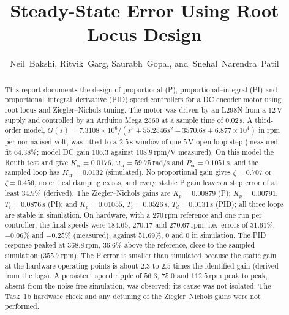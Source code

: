 \documentclass[lettersize,journal]{IEEEtran}
\newcommand{\code}[1]{\texttt{\detokenize{#1}}}
\newcommand{\Kcr}{K_{\mathrm{cr}}}
\newcommand{\wcr}{\omega_{\mathrm{cr}}}
\newcommand{\Pcr}{P_{\mathrm{cr}}}
\newcommand{\rpm}{\,\text{rpm}}
\begin{document}
\title{Steady-State Error Using Root Locus Design}

\author{Neil~Bakshi,
        Ritvik~Garg,
        Saurabh~Gopal,
        and~Snehal~Narendra~Patil
        }


\maketitle

\begin{abstract}
This report documents the design of proportional (P), proportional--integral (PI) and proportional--integral--derivative (PID) speed controllers for a DC encoder motor using root locus and Ziegler--Nichols tuning. The motor was driven by an L298N from a $12\,\text{V}$ supply and controlled by an Arduino Mega 2560 at a sample time of $0.02\,\text{s}$. A third-order model, $G(s)=7.3108\times10^{6}/(s^3+55.2546s^2+3570.6s+6.877\times10^{4})$ in rpm per normalised volt, was fitted to a $2.5\,\text{s}$ window of one $5\,\text{V}$ open-loop step (measured; fit $64.38\%$; model DC gain $106.3$ against $108.9\rpm/\text{V}$ measured). On this model the Routh test and \code{allmargin} give $\Kcr=0.0176$, $\wcr=59.75\,\text{rad/s}$ and $\Pcr=0.1051\,\text{s}$, and the sampled loop has $\Kcr=0.0132$ (simulated). No proportional gain gives $\zeta=0.707$ or $\zeta=0.456$, no critical damping exists, and every stable P gain leaves a step error of at least $34.9\%$ (derived). The Ziegler--Nichols gains are $K_p=0.00879$ (P); $K_p=0.00791$, $T_i=0.0876\,\text{s}$ (PI); and $K_p=0.01055$, $T_i=0.0526\,\text{s}$, $T_d=0.0131\,\text{s}$ (PID); all three loops are stable in simulation. On hardware, with a $270\rpm$ reference and one run per controller, the final speeds were $184.65$, $270.17$ and $270.67\rpm$, i.e.\ errors of $31.61\%$, $-0.06\%$ and $-0.25\%$ (measured), against $51.69\%$, $0$ and $0$ in simulation. The PID response peaked at $368.8\rpm$, $36.6\%$ above the reference, close to the sampled simulation ($355.7\rpm$). The P error is smaller than simulated because the static gain at the hardware operating points is about $2.3$ to $2.5$ times the identified gain (derived from the logs). A persistent speed ripple of $56.3$, $75.0$ and $112.5\rpm$ peak to peak, absent from the noise-free simulation, was observed; its cause was not isolated. The Task~1b hardware check and any detuning of the Ziegler--Nichols gains were not performed.
\end{abstract}
\end{document}

